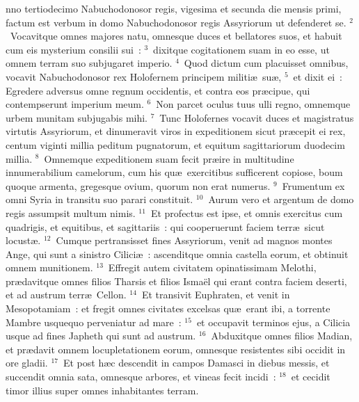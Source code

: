 \bchapter
{}nno tertiodecimo Nabuchodonosor regis, vigesima et secunda die mensis primi, factum est verbum in domo Nabuchodonosor regis Assyriorum ut defenderet se.
${}^{2}$~Vocavitque omnes majores natu, omnesque duces et bellatores suos, et habuit cum eis mysterium consilii sui~:
${}^{3}$~dixitque cogitationem suam in eo esse, ut omnem terram suo subjugaret imperio.
${}^{4}$~Quod dictum cum placuisset omnibus, vocavit Nabuchodonosor rex Holofernem principem militi\ae\ su\ae ,
${}^{5}$~et dixit ei~: Egredere adversus omne regnum occidentis, et contra eos pr\ae cipue, qui contempserunt imperium meum.
${}^{6}$~Non parcet oculus tuus ulli regno, omnemque urbem munitam subjugabis mihi.
${}^{7}$~Tunc Holofernes vocavit duces et magistratus virtutis Assyriorum, et dinumeravit viros in expeditionem sicut pr\ae cepit ei rex, centum viginti millia peditum pugnatorum, et equitum sagittariorum duodecim millia.
${}^{8}$~Omnemque expeditionem suam fecit pr\ae ire in multitudine innumerabilium camelorum, cum his qu\ae\ exercitibus sufficerent copiose, boum quoque armenta, gregesque ovium, quorum non erat numerus.
${}^{9}$~Frumentum ex omni Syria in transitu suo parari constituit.
${}^{10}$~Aurum vero et argentum de domo regis assumpsit multum nimis.
${}^{11}$~Et profectus est ipse, et omnis exercitus cum quadrigis, et equitibus, et sagittariis~: qui cooperuerunt faciem terr\ae\ sicut locust\ae .
${}^{12}$~Cumque pertransisset fines Assyriorum, venit ad magnos montes Ange, qui sunt a sinistro Cilici\ae~: ascenditque omnia castella eorum, et obtinuit omnem munitionem.
${}^{13}$~Effregit autem civitatem opinatissimam Melothi, pr\ae davitque omnes filios Tharsis et filios Isma\"el qui erant contra faciem deserti, et ad austrum terr\ae\ Cellon.
${}^{14}$~Et transivit Euphraten, et venit in Mesopotamiam~: et fregit omnes civitates excelsas qu\ae\ erant ibi, a torrente Mambre usquequo perveniatur ad mare~:
${}^{15}$~et occupavit terminos ejus, a Cilicia usque ad fines Japheth qui sunt ad austrum.
${}^{16}$~Abduxitque omnes filios Madian, et pr\ae davit omnem locupletationem eorum, omnesque resistentes sibi occidit in ore gladii.
${}^{17}$~Et post h\ae c descendit in campos Damasci in diebus messis, et succendit omnia sata, omnesque arbores, et vineas fecit incidi~:
${}^{18}$~et cecidit timor illius super omnes inhabitantes terram.

